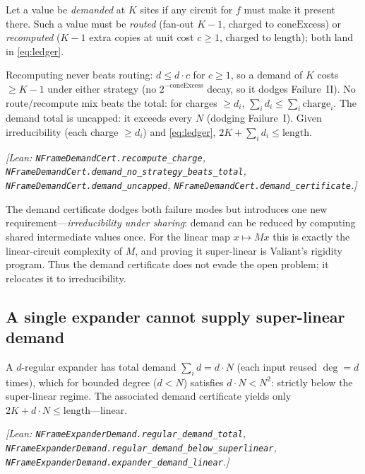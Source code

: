 Let a value be \emph{demanded} at $K$ sites if any circuit for $f$ must make it
present there.  Such a value must be \emph{routed} (fan-out $K{-}1$, charged to
$\mathrm{coneExcess}$) or \emph{recomputed} ($K{-}1$ extra copies at unit cost
$c\ge 1$, charged to $\mathrm{length}$); both land in \eqref{eq:ledger}.

\begin{lemma}
\label{lem:demand}
Recomputing never beats routing: $d\le d\cdot c$ for $c\ge 1$, so a demand of $K$
costs $\ge K{-}1$ under either strategy (no $2^{-\mathrm{coneExcess}}$ decay, so it
dodges Failure~II).  No route/recompute mix beats the total: for charges
$\ge d_i$, $\sum_i d_i\le\sum_i \mathrm{charge}_i$.  The demand total is uncapped:
it exceeds every $N$ (dodging Failure~I).  Given irreducibility (each charge
$\ge d_i$) and \eqref{eq:ledger}, $2K+\sum_i d_i\le \mathrm{length}$.
\end{lemma}
\noindent\emph{[Lean: \texttt{NFrameDemandCert.recompute\_charge},
\texttt{NFrameDemandCert.demand\_no\_strategy\_beats\_total},
\texttt{NFrameDemandCert.demand\_uncapped},
\texttt{NFrameDemandCert.demand\_certificate}.]}

The demand certificate dodges both failure modes but introduces one new
requirement---\emph{irreducibility under sharing}: demand can be reduced by
computing shared intermediate values once.  For the linear map $x\mapsto Mx$ this
is exactly the linear-circuit complexity of $M$, and proving it super-linear is
Valiant's rigidity program.  Thus the demand certificate does not evade the open
problem; it relocates it to irreducibility.

\subsection{A single expander cannot supply super-linear demand}

\begin{lemma}
\label{lem:expander-cap}
A $d$-regular expander has total demand $\sum_{i} d = d\cdot N$ (each input reused
$\deg=d$ times), which for bounded degree ($d<N$) satisfies $d\cdot N<N^{2}$:
strictly below the super-linear regime.  The associated demand certificate yields
only $2K+d\cdot N\le \mathrm{length}$---linear.
\end{lemma}
\noindent\emph{[Lean: \texttt{NFrameExpanderDemand.regular\_demand\_total},
\texttt{NFrameExpanderDemand.regular\_demand\_below\_superlinear},
\texttt{NFrameExpanderDemand.expander\_demand\_linear}.]}

